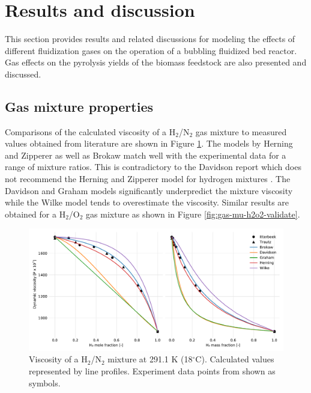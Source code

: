 \documentclass{article}
\begin{document}
\section{Results and discussion}

This section provides results and related discussions for modeling the effects of different fluidization gases on the operation of a bubbling fluidized bed reactor. Gas effects on the pyrolysis yields of the biomass feedstock are also presented and discussed.

\subsection{Gas mixture properties}

Comparisons of the calculated viscosity of a H$_2$/N$_2$ gas mixture to measured values obtained from literature are shown in Figure \ref{fig:gas-mu-h2n2-validate}. The models by Herning and Zipperer as well as Brokaw match well with the experimental data for a range of mixture ratios. This is contradictory to the Davidson report which does not recommend the Herning and Zipperer model for hydrogen mixtures \cite{Davidson-1993}. The Davidson and Graham models significantly underpredict the mixture viscosity while the Wilke model tends to overestimate the viscosity. Similar results are obtained for a H$_2$/O$_2$ gas mixture as shown in Figure \ref{fig:gas-mu-h2o2-validate}.

\begin{figure}[H]
    \centering
    \includegraphics[width=\textwidth]{figures/gas-mu-h2n2-validate.pdf}
    \caption{Viscosity of a H$_2$/N$_2$ mixture at 291.1 K (18$^\circ$C). Calculated values represented by line profiles. Experiment data points from \cite{Itterbeek-1947,Trautz-1929} shown as symbols.}
    \label{fig:gas-mu-h2n2-validate}
\end{figure}
\end{document}
